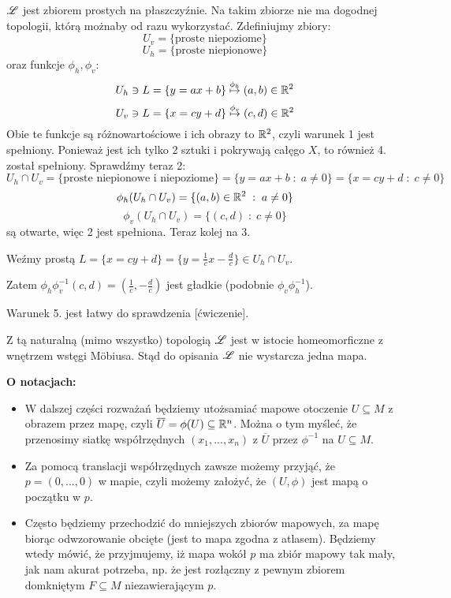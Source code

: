 \begin{example}
\item $\mathcal{L}$ jest zbiorem prostych na płaszczyźnie. Na takim zbiorze nie ma dogodnej topologii, którą możnaby od razu wykorzystać. Zdefiniujmy zbiory:
  $$U_v=\{\text{proste niepoziome}\}$$
  $$U_h=\{\text{proste niepionowe}\}$$
  oraz funkcje $\phi_h, \phi_v$:
  $$U_h\ni L=\{y=ax+b\}\overset{\phi_h}{\mapsto} (a, b)\in\mathbb{R}^2$$
  $$U_v\ni L=\{x=cy+d\}\overset{\phi_v}{\mapsto} (c, d)\in\mathbb{R}^2$$
  Obie te funkcje są różnowartościowe i ich obrazy to $\mathbb{R}^2$, czyli warunek 1 jest spełniony. Ponieważ jest ich tylko 2 sztuki i pokrywają całęgo $X$, to również 4. został spełniony. Sprawdźmy teraz 2:
  $$U_h\cap U_v=\{\text{proste niepionowe i niepoziome}\}=\{y=ax+b\;:\;a\neq 0\}=\{x=cy+d\;:\;c\neq0\}$$
  $$\phi_h(U_h\cap U_v)=\{(a, b)\in\mathbb{R}^2\;:\;a\neq 0\}$$
  $$\phi_v(U_h\cap U_v)=\{(c, d)\;:\;c\neq0\}$$
  są otwarte, więc 2 jest spełniona. Teraz kolej na 3.
  
  Weźmy prostą $L=\{x=cy+d\}=\{y=\frac{1}{c}x-\frac{d}{c}\}\in U_h\cap U_v$. 
  \begin{center}\end{center}
  Zatem $\phi_h\phi_v^{-1}(c, d)=\left(\frac1c,-\frac{d}{c}\right)$ jest gładkie (podobnie $\phi_v\phi_h^{-1}$).

  Warunek 5. jest łatwy do sprawdzenia [ćwiczenie].

  Z tą naturalną (mimo wszystko) topologią $\mathcal{L}$ jest w istocie homeomorficzne z wnętrzem wstęgi M\"obiusa. Stąd do opisania $\mathcal{L}$ nie wystarcza jedna mapa.
\end{example}
\bigskip

\textbf{O notacjach:}

\begin{itemize}
  \item W dalszej części rozważań będziemy utożsamiać mapowe otoczenie $U\subseteq M$ z obrazem przez mapę, czyli $\overline{U}=\phi(U)\subseteq\mathbb{R}^n$. Można o tym myśleć, że przenosimy siatkę współrzędnych $(x_1,...,x_n)$ z $\overline{U}$ przez $\phi^{-1}$ na $U\subseteq M$.
  \item Za pomocą translacji współrzędnych zawsze możemy przyjąć, że $p=(0,...,0)$ w mapie, czyli możemy założyć, że $(U,\phi)$ jest mapą o początku w $p$.
  \item Często będziemy przechodzić do mniejszych zbiorów mapowych, za mapę biorąc odwzorowanie obcięte (jest to mapa zgodna z atlasem). Będziemy wtedy mówić, że przyjmujemy, iż mapa wokół $p$ ma zbiór mapowy tak mały, jak nam akurat potrzeba, np. że jest rozłączny z pewnym zbiorem domkniętym $F\subseteq M$ niezawierającym $p$.
\end{itemize}

